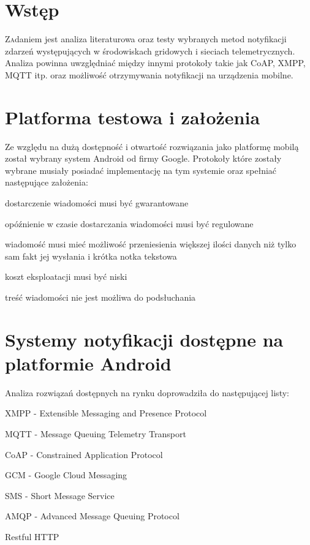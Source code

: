 \documentclass[twoside]{article}
\begin{document}
\begin{multicols}{2}

\section{Wstęp}

\lettrine[nindent=0em,lines=3]{Z} adaniem jest analiza literaturowa oraz testy wybranych metod notyfikacji zdarzeń występujących w środowiskach gridowych i sieciach telemetrycznych. Analiza powinna uwzględniać między innymi protokoły takie jak CoAP, XMPP, MQTT itp. oraz możliwość otrzymywania notyfikacji na urządzenia mobilne.

\section{Platforma testowa i założenia}
Ze względu na dużą dostępność i otwartość rozwiązania jako platformę mobilą został wybrany system Android od firmy Google. Protokoły które zostały wybrane musiały posiadać implementację na tym systemie oraz spełniać następujące założenia:
\begin{compactitem}
\item dostarczenie wiadomości musi być gwarantowane
\item opóźnienie w czasie dostarczania wiadomości musi być regulowane
\item wiadomość musi mieć możliwość przeniesienia większej ilości danych niż tylko sam fakt jej wysłania i krótka notka tekstowa
\item koszt eksploatacji musi być niski
\item treść wiadomości nie jest możliwa do podsłuchania
\end{compactitem}

\section{Systemy notyfikacji dostępne na platformie Android}

Analiza rozwiązań dostępnych na rynku doprowadziła do następującej listy:
\begin{compactitem}
\item XMPP - Extensible Messaging and Presence Protocol
\item MQTT - Message Queuing Telemetry Transport 
\item CoAP - Constrained Application Protocol
\item GCM - Google Cloud Messaging
\item SMS - Short Message Service
\item AMQP - Advanced Message Queuing Protocol
\item Restful HTTP
\end{compactitem}


\end{multicols}
\end{document}

